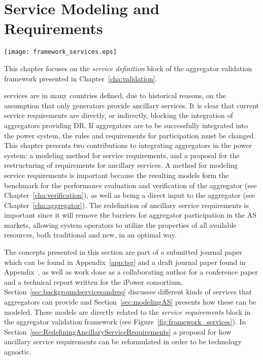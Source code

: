 \chapter{Service Modeling and Requirements} %
\label{cha:services}
\begin{marginfigure}
	\texttt{[image: framework\_services.eps]}
	\caption{This chapter focuses on the \emph{service definition} block of the aggregator validation framework presented in Chapter~\ref{cha:validation}.}
      \label{fig:framework_services}
\end{marginfigure}

 services are in many countries defined, due to historical reasons, on the assumption that only generators provide ancillary services. It is clear that current service requirements are directly, or indirectly, blocking the integration of aggregators providing DR. If aggregators are to be successfully integrated into the power system, the rules and requirements for participation must be changed. This chapter presents two contributions to integrating aggregators in the power system: a modeling method for service requirements, and a proposal for the restructuring of requirements for ancillary services. A method for modeling service requirements is important because the resulting models form the benchmark for the performance evaluation and verification of the aggregator (see Chapter~\ref{cha:verification}), as well as being a direct input to the aggregator (see Chapter~\ref{cha:aggregator}). The redefinition of ancillary service requirements is important since it will remove the barriers for aggregator participation in the AS markets, allowing system operators to utilize the properties of all available resources, both traditional and new, in an optimal way. 

The concepts presented in this section are part of a submitted journal paper which can be found in Appendix~\ref{app:tsg} and a draft journal paper found in Appendix~, as well as work done as a collaborating author for a conference paper and a technical report written for the iPower consortium. Section~\ref{sec:backgroundservicesandreq} discusses different kinds of services that aggregators can provide and Section~\ref{sec:modelingAS} presents how these can be modeled. These models are directly related to the \emph{service requirements} block in the aggregator validation framework (see Figure~\ref{fig:framework_services}). In Section~\ref{sec:RedefiningAncillaryServiceRequirements} a proposal for how ancillary service requirements can be reformulated in order to be technology agnostic. 

